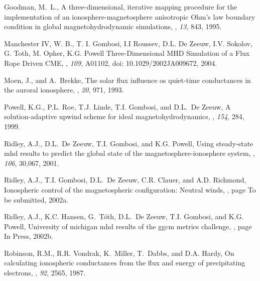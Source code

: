 \begin{thebibliography}{{\em Moen and Brekke}(1993}

Goodman, M.~L.,
\newblock A three-dimensional, iterative mapping procedure for the
  implementation of an ionosphere-magnetosphere anisotropic {Ohm's} law
  boundary condition in global magnetohydrodynamic simulations,
, {\em 13}, 843, 1995.

 Manchester IV,
W. B., T. I. Gombosi, I.I Roussev, D.L. De Zeeuw, I.V. Sokolov,
G. Toth, M. Opher, K.G. Powell \newblock Three-Dimensional MHD
Simulation of a Flux Rope Driven CME, , {\em 109}, A01102, doi: 10.1029/2002JA009672, 2004.

Moen, J., and A.~Brekke,
\newblock The solar flux influence os quiet-time conductances in the auroral
  ionosphere,
, {\em 20}, 971, 1993.

Powell, K.G., P.L. Roe, T.J. Linde, T.I. Gombosi, and D.L.~De Zeeuw,
\newblock A solution-adaptive upwind scheme for ideal magnetohydrodynamics,
, {\em 154}, 284, 1999.

Ridley, A.J., D.L.~De Zeeuw, T.I. Gombosi, and K.G. Powell,
\newblock Using steady-state mhd results to predict the global state of the
  magnetosphere-ionosphere system,
, {\em 106}, 30,067, 2001.

Ridley, A.J., T.I. Gombosi, D.L.~De Zeeuw, C.R. Clauer, and A.D. Richmond,
\newblock Ionospheric control of the magnetospheric configuration: Neutral
  winds,
, page To be submitted, 2002a.

Ridley, A.J., K.C. Hansen, G.~T\'oth, D.L.~De Zeeuw, T.I. Gombosi, and K.G.
  Powell,
\newblock University of michigan mhd results of the ggcm metrics challenge,
, page In Press, 2002b.

Robinson, R.M., R.R. Vondrak, K.~Miller, T.~Dabbs, and D.A. Hardy,
\newblock On calculating ionospheric conductances from the flux and energy of
  precipitating electrons,
, {\em 92}, 2565, 1987.

\end{thebibliography}
